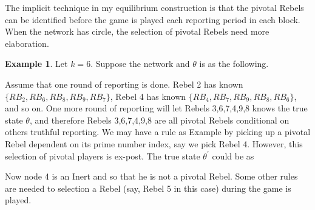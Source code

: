 \documentclass[12pt,letter]{article}
\theoremstyle{definition}
\newtheorem{example}{Example}[section]
\theoremstyle{remark}
\theoremstyle{claim}
\begin{document}
The implicit technique in my equilibrium construction is that the pivotal Rebels can be identified before the game is played each reporting period in each block. When the network has circle, the selection of pivotal Rebels need more elaboration. 
\begin{example}\label{ex_free_rider_circle}
Let $k=6$. Suppose the network and $\theta$ is as the following. 




\begin{center}
\end{center}

Assume that one round of reporting is done. Rebel 2 has known $\{RB_2,RB_6,RB_8,RB_9,RB_7\}$, Rebel 4 has known $\{RB_4,RB_7,RB_9,RB_8,RB_6\}$, and so on. One more round of reporting will let Rebels 3,6,7,4,9,8 knows the true state $\theta$, and therefore Rebels 3,6,7,4,9,8 are all pivotal Rebels conditional on others truthful reporting. We may have a rule as Example by picking up a pivotal Rebel dependent on its prime number index, say we pick Rebel 4. However, this selection of pivotal players is ex-post. The true state $\theta^{'}$ could be as 

\begin{center}
\end{center}

Now node 4 is an Inert and so that he is not a pivotal Rebel. Some other rules are needed to selection a Rebel (say, Rebel 5 in this case) during the game is played. 

\end{example}
\end{document}
